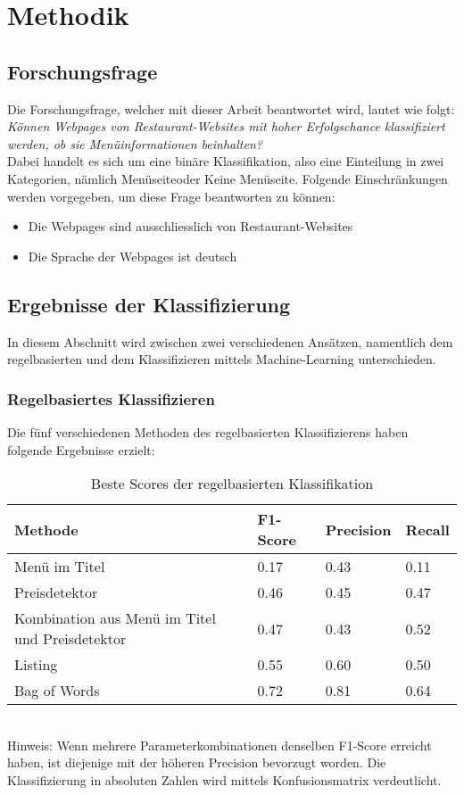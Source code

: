 \chapter{Methodik}
\section{Forschungsfrage}
Die Forschungsfrage, welcher mit dieser Arbeit beantwortet wird, lautet wie folgt:\\
\emph{Können Webpages von Restaurant-Websites mit hoher Erfolgschance klassifiziert werden, ob sie Menüinformationen beinhalten?}\\
Dabei handelt es sich um eine binäre Klassifikation, also eine Einteilung in zwei Kategorien, nämlich \glqq Menüseite\grqq oder \glqq Keine Menüseite\grqq.
Folgende Einschränkungen werden vorgegeben, um diese Frage beantworten zu können:
\begin{itemize}
	\item Die Webpages sind ausschliesslich von Restaurant-Websites
	\item Die Sprache der Webpages ist deutsch
\end{itemize}
\section{Ergebnisse der Klassifizierung}
In diesem Abschnitt wird zwischen zwei verschiedenen Ansätzen, namentlich dem regelbasierten und dem Klassifizieren mittels Machine-Learning unterschieden.
\subsection{Regelbasiertes Klassifizieren}
Die fünf verschiedenen Methoden des regelbasierten Klassifizierens haben folgende Ergebnisse erzielt:\\
\begin{table}
\caption{Beste Scores der regelbasierten Klassifikation}
\centering
\begin{tabular}{|l|l|l|l|}
	\hline
	Methode & F1-Score & Precision & Recall\\
	\hline
	Menü im Titel & 0.17 & 0.43 & 0.11 \\
	Preisdetektor & 0.46 & 0.45 & 0.47 \\
	Kombination aus Menü im Titel und Preisdetektor & 0.47 & 0.43 & 0.52\\
	Listing & 0.55 & 0.60 & 0.50\\
	Bag of Words & 0.72 & 0.81 & 0.64\\
	\hline
\end{tabular}
\end{table}\\
Hinweis: Wenn mehrere Parameterkombinationen denselben F1-Score erreicht haben, ist diejenige mit der höheren Precision bevorzugt worden.
Die Klassifizierung in absoluten Zahlen wird mittels Konfusionsmatrix verdeutlicht.

